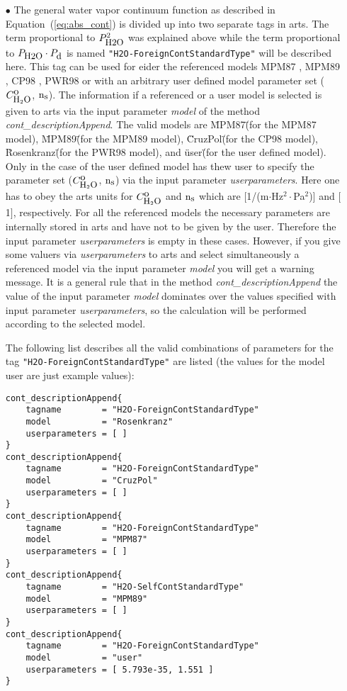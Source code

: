 \begin{itemize}
\item[$\bullet$] The general water vapor continuum function
as described in Equation~(\ref{eq:abs_cont}) is divided up into 
two separate tags in arts. The term proportional 
to $P_{\mbox{\rm \small H2O}}^2$ was explained above while the term proportional 
to $P_{\mbox{\rm \small H2O}} \cdot P_{\mbox{\rm \small d}}$ is named {\tt "H2O-ForeignContStandardType"}
will be described here.
This tag can be used for eider the referenced models 
MPM87 \citep{liebeandlayton:87}, MPM89 \citep{liebe:89}, 
CP98 \citep{cruzpol:98}, PWR98 \citep{pwr:98} or with
an arbitrary user defined model parameter set ($C^{\mbox{\rm o}}_{\mbox{\rm \small H}_{2}\mbox{\rm \small O}}$, ${\rm n}_{\mbox{\rm \small s}}$).
The information if a referenced or a user model is selected 
is given to arts via the input parameter {\it model} of the 
method {\it cont\_descriptionAppend}. The valid models are
\"MPM87\" (for the MPM87 model), \"MPM89\" (for the MPM89 model), 
\"CruzPol\" (for the CP98 model), \"Rosenkranz\" (for the PWR98 model), 
and \"user\"  (for the user defined model). Only in the case 
of the user defined model has thew user to specify the 
parameter set ($C^{\mbox{\rm o}}_{\mbox{\rm \small H}_{2}\mbox{\rm \small O}}$, ${\rm n}_{\mbox{\rm \small s}}$) via the input parameter 
{\it userparameters}. Here one has to obey the arts units for 
$C^{\mbox{\rm o}}_{\mbox{\rm \small H}_{2}\mbox{\rm \small O}}$ and ${\rm n}_{\mbox{\rm \small s}}$ which are $[$1/(m$\cdot$Hz$^2\cdot$Pa$^2$)$]$ and 
$[$1$]$, respectively. For all the referenced models the necessary
parameters are internally stored in arts and have not to be given by
the user. Therefore the input parameter {\it userparameters} is empty
in these cases. However, if you give some valuers via 
{\it userparameters} to arts and select simultaneously a 
referenced model via the input parameter {\it model} you will get 
a warning message. It is a general rule that in the method 
{\it cont\_descriptionAppend} the value of the input 
parameter {\it model} dominates over the values specified with 
input parameter {\it userparameters}, so the calculation will be
performed according to the selected model.

The following list describes all the valid combinations of parameters for the
tag {\tt "H2O-ForeignContStandardType"} are listed (the values for the 
model user are just example values): 
\begin{lstlisting}
cont_descriptionAppend{
    tagname        = "H2O-ForeignContStandardType"
    model          = "Rosenkranz"
    userparameters = [ ]
}
cont_descriptionAppend{
    tagname        = "H2O-ForeignContStandardType"
    model          = "CruzPol"
    userparameters = [ ]
}
cont_descriptionAppend{
    tagname        = "H2O-ForeignContStandardType"
    model          = "MPM87"
    userparameters = [ ]
}
cont_descriptionAppend{
    tagname        = "H2O-SelfContStandardType"
    model          = "MPM89"
    userparameters = [ ]
}
cont_descriptionAppend{
    tagname        = "H2O-ForeignContStandardType"
    model          = "user"
    userparameters = [ 5.793e-35, 1.551 ]
}
\end{lstlisting}



\end{itemize}
